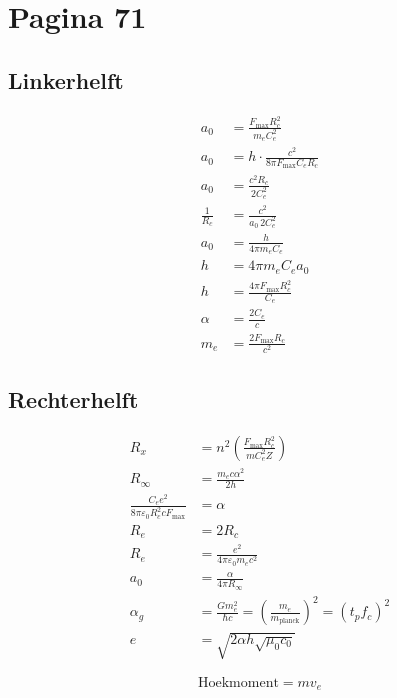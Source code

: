 \documentclass[11pt,a4paper]{article}
\begin{document}
\clearpage
\section*{Pagina 71}

\begin{minipage}[t]{0.48\textwidth}
\subsection*{Linkerhelft}

\begin{align*}
a_0 &= \frac{F_{\max} R_c^2}{m_e C_e^2}
\\[0.4em]
a_0 &= h\cdot \frac{c^2}{8\pi F_{\max} C_e R_c}
\\[0.4em]
a_0 &= \frac{c^2 R_c}{2C_e^2}
\\[0.4em]
\frac{1}{R_c} &= \frac{c^2}{a_0\,2C_e^2}
\\[0.4em]
a_0 &= \frac{h}{4\pi m_e C_e}
\\[0.4em]
h &= 4\pi m_e C_e a_0
\\[0.4em]
h &= \frac{4\pi F_{\max} R_c^2}{C_e}
\\[0.4em]
\alpha &= \frac{2C_e}{c}
\\[0.4em]
m_e &= \frac{2F_{\max} R_c}{c^2}
\end{align*}
\end{minipage}
\hfill
\begin{minipage}[t]{0.48\textwidth}
\subsection*{Rechterhelft}

\begin{align*}
R_x &= n^2
\left(
\frac{F_{\max} R_c^2}{m C_e^2 Z}
\right)
\\[0.5em]
R_\infty &= \frac{m_e c \alpha^2}{2h}
\\[0.5em]
\frac{C_e e^2}{8\pi\varepsilon_0 R_c^2 c F_{\max}}
&= \alpha
\\[0.5em]
R_e &= 2R_c
\\
R_e &= \frac{e^2}{4\pi\varepsilon_0 m_e c^2}
\\[0.5em]
a_0 &= \frac{\alpha}{4\pi R_\infty}
\\[0.5em]
\alpha_g &= \frac{Gm_e^2}{\hbar c}
= \left(\frac{m_e}{m_{\text{planck}}}\right)^2
= (t_p f_c)^2
\\[0.5em]
e &= \sqrt{2\alpha h \sqrt{\mu_0 c_0}}
\end{align*}

\[
\text{Hoekmoment} = mv_e
\]
\end{minipage}
\end{document}
